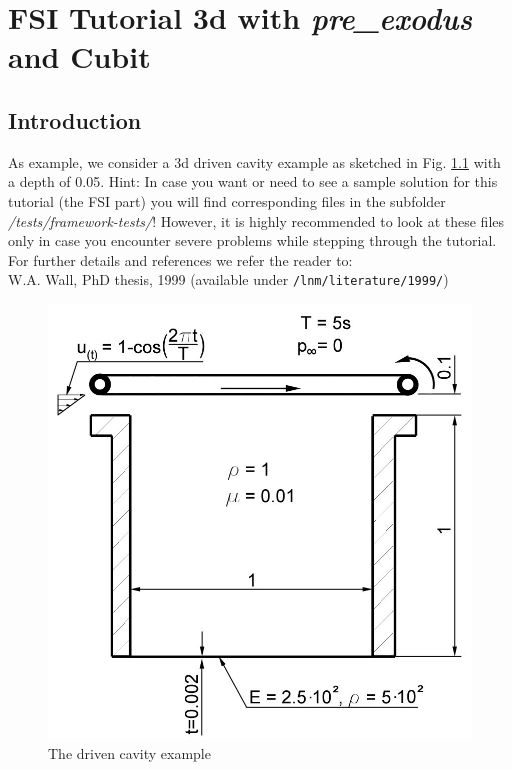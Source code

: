 \newcommand{\prexo}{\emph{pre\_exodus \,}}
\newcommand{\bc}{\emph{bc-file \,}}
\newcommand{\head}{\emph{header-file \,}}

\chapter{FSI Tutorial 3d with \prexo and Cubit}
\label{tut_fsi_preexo:chap}

\section{Introduction}

As example, we consider a 3d driven cavity example as
sketched in Fig. \ref{tut_fsi_preexo:1.1} with a depth of 0.05.
Hint: In case you want or need to see a sample solution for this tutorial (the FSI part)
you will find corresponding files in the \baci{} subfolder \emph{/tests/framework-tests/}!
However, it is highly recommended to look at these files only in case you encounter severe problems
while stepping through the tutorial.\\
For further details and references we refer the reader to:\\
W.A. Wall, PhD thesis, 1999
(available under \texttt{/lnm/literature/1999/})

\begin{figure}[h]
\hfil\includegraphics[scale=0.2]{Bilder/Angabeskizze}

\caption{\label{tut_fsi_preexo:1.1} The driven cavity example}
\end{figure}

